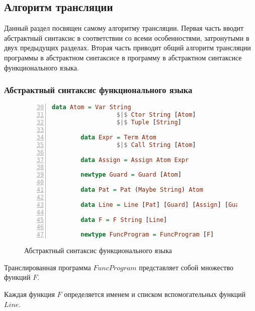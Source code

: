 \subsection{Алгоритм трансляции}

Данный раздел посвящен самому алгоритму трансляции.
Первая часть вводит абстрактный синтаксис в соответствии со всеми особенностями, затронутыми в двух предыдущих разделах.
Вторая часть приводит общий алгоритм трансляции программы в абстрактном синтаксисе \miniKanren{} в программу в абстрактном синтаксисе функционального языка.


\subsubsection{Абстрактный синтаксис функционального языка}

\begin{figure}[h!]
  \begin{center}
  \begin{minipage}{0.7\textwidth}
  \begin{lstlisting}[language=Haskell, frame=single, numbers=left,numberstyle=\small, firstnumber=30, escapechar=|]
        data Atom = Var String
                  $|$ Ctor String [Atom]
                  $|$ Tuple [String]
        
        data Expr = Term Atom
                  $|$ Call String [Atom]
        
        data Assign = Assign Atom Expr
        
        newtype Guard = Guard [Atom]
        
        data Pat = Pat (Maybe String) Atom
        
        data Line = Line [Pat] [Guard] [Assign] [Guard] Expr
        
        data F = F String [Line]
        
        newtype FuncProgram = FuncProgram [F]
    \end{lstlisting}
  \end{minipage}
  \end{center}
  \caption{Абстрактный синтаксис функционального языка}
  \label{lst:funcast}
\end{figure}

Транслированная программа $FuncProgram$ представляет собой множество функций $F$.

Каждая функция $F$ определяется именем и списком вспомогательных функций $Line$.

